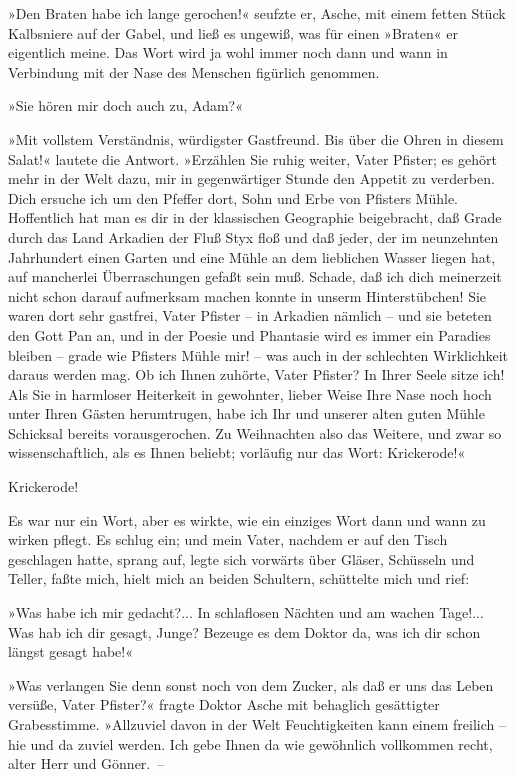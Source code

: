 »Den Braten habe ich lange gerochen!« seufzte er, Asche, mit einem
fetten Stück Kalbsniere auf der Gabel, und ließ es ungewiß, was für
einen »Braten« er eigentlich meine. Das Wort wird ja wohl immer
noch dann und wann in Verbindung mit der Nase des Menschen
figürlich genommen.

»Sie hören mir doch auch zu, Adam?«

»Mit vollstem Verständnis, würdigster Gastfreund. Bis über die
Ohren in diesem Salat!« lautete die Antwort. »Erzählen Sie ruhig
weiter, Vater Pfister; es gehört mehr in der Welt dazu, mir in
gegenwärtiger Stunde den Appetit zu verderben. Dich ersuche ich um
den Pfeffer dort, Sohn und Erbe von Pfisters Mühle. Hoffentlich hat
man es dir in der klassischen Geographie beigebracht, daß Grade
durch das Land Arkadien der Fluß Styx floß und daß jeder, der im
neunzehnten Jahrhundert einen Garten und eine Mühle an dem
lieblichen Wasser liegen hat, auf mancherlei Überraschungen gefaßt
sein muß. Schade, daß ich dich meinerzeit nicht schon darauf
aufmerksam machen konnte in unserm Hinterstübchen! Sie waren dort
sehr gastfrei, Vater Pfister – in Arkadien nämlich – und sie
beteten den Gott Pan an, und in der Poesie und Phantasie wird es
immer ein Paradies bleiben – grade wie Pfisters Mühle mir! – was
auch in der schlechten Wirklichkeit daraus werden mag. Ob ich Ihnen
zuhörte, Vater Pfister? In Ihrer Seele sitze ich! Als Sie in
harmloser Heiterkeit in gewohnter, lieber Weise Ihre Nase noch hoch
unter Ihren Gästen herumtrugen, habe ich Ihr und unserer alten
guten Mühle Schicksal bereits vorausgerochen. Zu Weihnachten also
das Weitere, und zwar so wissenschaftlich, als es Ihnen beliebt;
vorläufig nur das Wort: Krickerode!«

Krickerode!

Es war nur ein Wort, aber es wirkte, wie ein einziges Wort dann und
wann zu wirken pflegt. Es schlug ein; und mein Vater, nachdem er
auf den Tisch geschlagen hatte, sprang auf, legte sich vorwärts
über Gläser, Schüsseln und Teller, faßte mich, hielt mich an beiden
Schultern, schüttelte mich und rief:

»Was habe ich mir gedacht?... In schlaflosen Nächten und am wachen
Tage!... Was hab ich dir gesagt, Junge? Bezeuge es dem Doktor da,
was ich dir schon längst gesagt habe!«

»Was verlangen Sie denn sonst noch von dem Zucker, als daß er uns
das Leben versüße, Vater Pfister?« fragte Doktor Asche mit
behaglich gesättigter Grabesstimme. »Allzuviel davon in der Welt
Feuchtigkeiten kann einem freilich – hie und da zuviel werden. Ich
gebe Ihnen da wie gewöhnlich vollkommen recht, alter Herr und
Gönner.~–

